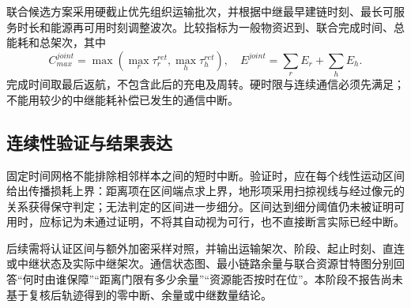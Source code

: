 联合候选方案采用硬截止优先组织运输批次，并根据中继最早建链时刻、最长可服务时长和能源再可用时刻调整波次。比较指标为一般物资迟到、联合完成时间、总能耗和总架次，其中
\begin{equation}
C_{max}^{joint}=\max\!\left(\max_r\tau_r^{ret},\max_h\tau_h^{ret}\right),\quad
E^{joint}=\sum_rE_r+\sum_hE_h.
\end{equation}
完成时间取最后返航，不包含此后的充电及周转。硬时限与连续通信必须先满足；不能用较少的中继能耗补偿已发生的通信中断。

\subsection{连续性验证与结果表达}
固定时间网格不能排除相邻样本之间的短时中断。验证时，应在每个线性运动区间给出传播损耗上界：距离项在区间端点求上界，地形项采用扫掠视线与经过像元的关系获得保守判定；无法判定的区间进一步细分。区间达到细分阈值仍未被证明可用时，应标记为未通过证明，不将其自动视为可行，也不直接断言实际已经中断。

后续需将认证区间与额外加密采样对照，并输出运输架次、阶段、起止时刻、直连或中继状态及实际中继架次。通信状态图、最小链路余量与联合资源甘特图分别回答“何时由谁保障”“距离门限有多少余量”“资源能否按时在位”。本阶段不报告尚未基于复核后轨迹得到的零中断、余量或中继数量结论。
